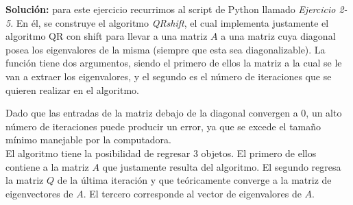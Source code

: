 \documentclass[letterpaper]{article}
\newcommand{\1}{\mathds{1}}
\theoremstyle{definition}
\theoremstyle{definition}
\theoremstyle{definition}
\theoremstyle{definition}
\theoremstyle{definition}
\begin{document}
\begin{enumerate}
    \textbf{Solución:} para este ejercicio recurrimos al script de Python llamado \textit{Ejercicio 2-5}.
    En él, se construye el algoritmo \textit{QRshift}, el cual implementa justamente el algoritmo QR con shift
    para llevar a una matriz $A$ a una matriz cuya diagonal posea los eigenvalores de la misma (siempre que esta sea 
    diagonalizable). La función tiene dos argumentos, siendo el primero de ellos la matriz 
    a la cual se le van a extraer los eigenvalores, y el segundo es el número de iteraciones 
    que se quieren realizar en el algoritmo.
    
    Dado que las entradas de la matriz debajo de la diagonal convergen a 0, un alto número 
    de iteraciones puede producir un error, ya que se excede el tamaño mínimo manejable por la computadora.\\
    
    El algoritmo tiene la posibilidad de regresar 3 objetos. El primero de ellos contiene 
    a la matriz $A$ que justamente resulta del algoritmo. El segundo regresa la matriz $Q$ de la última
    iteración y que teóricamente converge a la matriz de eigenvectores de $A$. El tercero corresponde al 
    vector de eigenvalores de $A$.
    \newline


\end{enumerate}
\end{document}
